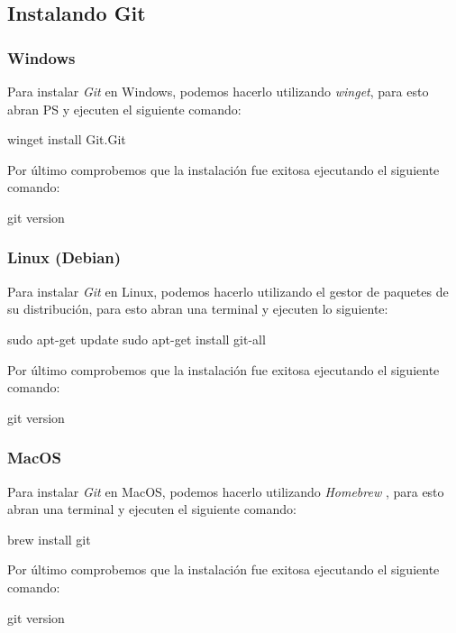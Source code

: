 \subsection{Instalando Git}
  \subsubsection{Windows}
    Para instalar \textit{Git} en Windows, podemos hacerlo utilizando \textit{winget},
     para esto abran PS y ejecuten el siguiente comando:

    \begin{powershell}
      winget install Git.Git
    \end{powershell}

    Por último comprobemos que la instalación fue exitosa ejecutando el siguiente comando:

    \begin{powershell}
      git version
    \end{powershell}

  \subsubsection{Linux (Debian)}
    Para instalar \textit{Git} en Linux, podemos hacerlo utilizando el gestor de paquetes de su
    distribución, para esto abran una terminal y ejecuten lo siguiente:

    \begin{bash}
      sudo apt-get update
      sudo apt-get install git-all
    \end{bash}

    Por último comprobemos que la instalación fue exitosa ejecutando el siguiente comando:

    \begin{bash}
      git version
    \end{bash}

  \subsubsection{MacOS}
    Para instalar \textit{Git} en MacOS, podemos hacerlo utilizando \textit{Homebrew}
    , para esto abran una terminal y ejecuten el siguiente comando:

    \begin{bash}
      brew install git
    \end{bash}

    Por último comprobemos que la instalación fue exitosa ejecutando el siguiente comando:

    \begin{bash}
      git version
    \end{bash}
